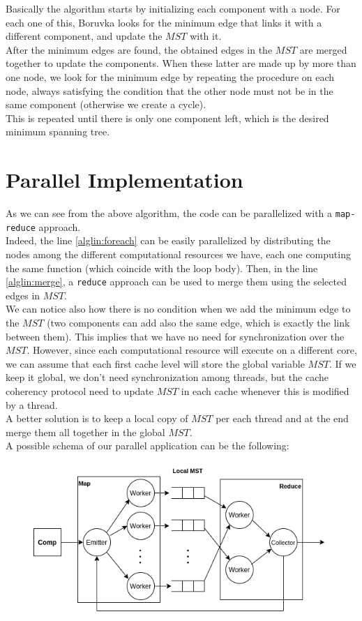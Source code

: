 \documentclass[notitlepage]{article}
\begin{document}
Basically the algorithm starts by initializing each component with a node. For each one of this, Boruvka looks for the minimum edge that links it with a different component, and update the $MST$ with it.\\
After the minimum edges are found, the obtained edges in the $MST$ are merged together to update the components. When these latter are made up by more than one node, we look for the minimum edge by 
repeating the procedure on each node, always satisfying the condition that the other node must not be in the same component (otherwise we create a cycle).\\
This is repeated until there is only one component left, which is the desired minimum spanning tree.

\section{Parallel Implementation}

As we can see from the above algorithm, the code can be parallelized with a \texttt{map-reduce} approach.\\
Indeed, the line \ref{alglin:foreach} can be easily parallelized by distributing the nodes among the different computational resources we have, each one computing the same function (which coincide with the loop body).
Then, in the line \ref{alglin:merge}, a \texttt{reduce} approach can be used to merge them using the selected edges in $MST$.\\
We can notice also how there is no condition when we add the minimum edge to the $MST$ (two components can add also the same edge, which is exactly the link between them). 
This implies that we have no need for synchronization over the $MST$. However, since each computational resource will execute on a different core, we can assume that each first cache level will store  
the global variable $MST$. If we keep it global, we don't need synchronization among threads, but the cache coherency protocol need to update $MST$ in each cache whenever this is modified by a thread.\\
A better solution is to keep a local copy of $MST$ per each thread and at the end merge them all together in the global $MST$.\\
A possible schema of our parallel application can be the following:

\begin{figure}[H]
  \centering\includegraphics[scale=0.7]{pics/parallel_schema.png}
\end{figure}
\end{document}
